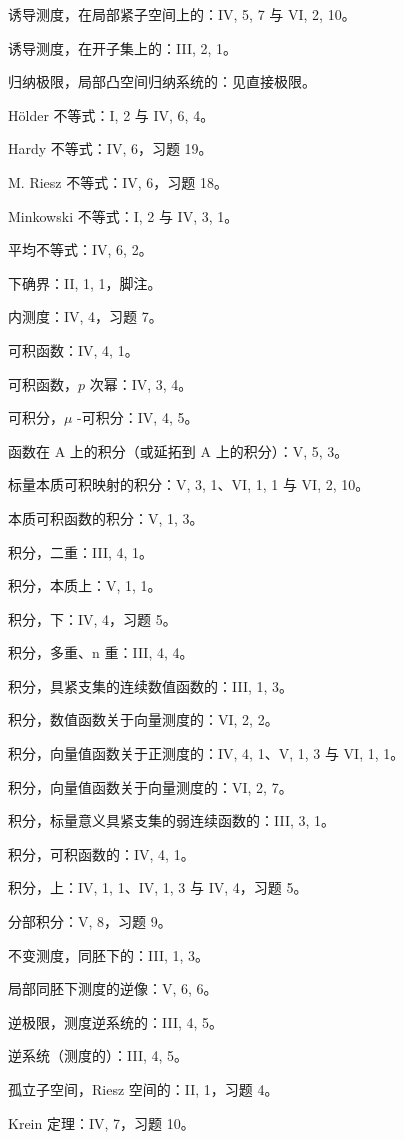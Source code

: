 诱导测度，在局部紧子空间上的：IV, 5, 7 与 VI, 2, 10。

诱导测度，在开子集上的：III, 2, 1。

归纳极限，局部凸空间归纳系统的：见直接极限。

Hölder 不等式：I, 2 与 IV, 6, 4。

Hardy 不等式：IV, 6，习题 19。

M. Riesz 不等式：IV, 6，习题 18。

Minkowski 不等式：I, 2 与 IV, 3, 1。

平均不等式：IV, 6, 2。

下确界：II, 1, 1，脚注。

内测度：IV, 4，习题 7。

可积函数：IV, 4, 1。

可积函数，\(p\) 次幂：IV, 3, 4。

可积分，\(\mu\) -可积分：IV, 4, 5。

函数在 A 上的积分（或延拓到 A 上的积分）：V, 5, 3。

标量本质可积映射的积分：V, 3, 1、VI, 1, 1 与 VI, 2, 10。

本质可积函数的积分：V, 1, 3。

积分，二重：III, 4, 1。

积分，本质上：V, 1, 1。

积分，下：IV, 4，习题 5。

积分，多重、n 重：III, 4, 4。

积分，具紧支集的连续数值函数的：III, 1, 3。

积分，数值函数关于向量测度的：VI, 2, 2。

积分，向量值函数关于正测度的：IV, 4, 1、V, 1, 3 与 VI, 1, 1。

积分，向量值函数关于向量测度的：VI, 2, 7。

积分，标量意义具紧支集的弱连续函数的：III, 3, 1。

积分，可积函数的：IV, 4, 1。

积分，上：IV, 1, 1、IV, 1, 3 与 IV, 4，习题 5。

分部积分：V, 8，习题 9。

不变测度，同胚下的：III, 1, 3。

局部同胚下测度的逆像：V, 6, 6。

逆极限，测度逆系统的：III, 4, 5。

逆系统（测度的）：III, 4, 5。

孤立子空间，Riesz 空间的：II, 1，习题 4。

Krein 定理：IV, 7，习题 10。

